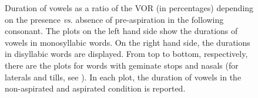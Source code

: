 \documentclass[11pt,a4paper,oneside,openany]{memoir}\usepackage[]{graphicx}\usepackage[]{color}
\newenvironment{knitrout}{}{} %
\begin{document}
\begin{figure}
\begin{subfigure}{.5\textwidth}
\begin{knitrout}
\end{knitrout}
\end{subfigure}
\caption[Duration of vowels as a ratio of the VOR (in percentages) depending on the presence \textit{vs}. absence of pre-aspiration in the following consonant.]{Duration of vowels as a ratio of the VOR (in percentages) depending on the presence \textit{vs}. absence of pre-aspiration in the following consonant.
The plots on the left hand side show the durations of vowels in monosyllabic words.
On the right hand side, the durations in disyllabic words are displayed.
From top to bottom, respectively, there are the plots for words with geminate stops and nasals (for laterals and tills, see ).
In each plot, the duration of vowels in the non-aspirated and aspirated condition is reported.
}
\label{f:vowelduration}
\end{figure}
\end{document}
